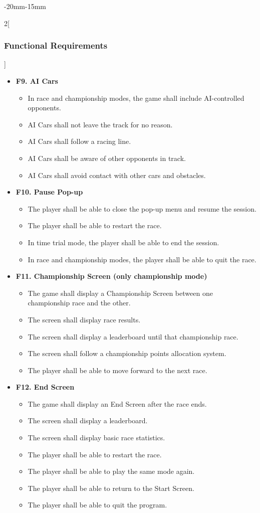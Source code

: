 \documentclass[12pt]{article}
\begin{document}
\begin{adjustwidth}{-20mm}{-15mm}
\begin{multicols}{2}[\subsubsection{Functional Requirements}]
\begin{itemize}[leftmargin=*]
\item \textbf{F9. AI Cars}
\begin{itemize}[leftmargin=*]
\item In race and championship modes, the game shall include AI-controlled opponents.
\item AI Cars shall not leave the track for no reason.
\item AI Cars shall follow a racing line.
\item AI Cars shall be aware of other opponents in track.
\item AI Cars shall avoid contact with other cars and obstacles.
\end{itemize}

\item \textbf{F10. Pause Pop-up}
\begin{itemize}[leftmargin=*]
\item The player shall be able to close the pop-up menu and resume the session.
\item The player shall be able to restart the race.
\item In time trial mode, the player shall be able to end the session.
\item In race and championship modes, the player shall be able to quit the race.
\end{itemize}

\item \textbf{F11. Championship Screen (only championship mode)}
\begin{itemize}[leftmargin=*]
\item The game shall display a Championship Screen between one championship race and the other.
\item The screen shall display race results.
\item The screen shall display a leaderboard until that championship race.
\item The screen shall follow a championship points allocation system.
\item The player shall be able to move forward to the next race.
\end{itemize}

\item \textbf{F12. End Screen}
\begin{itemize}[leftmargin=*]
\item The game shall display an End Screen after the race ends.
\item The screen shall display a leaderboard.
\item The screen shall display basic race statistics.
\item The player shall be able to restart the race.
\item The player shall be able to play the same mode again.
\item The player shall be able to return to the Start Screen.
\item The player shall be able to quit the program.
\end{itemize}
\end{itemize}


\end{multicols}
\end{adjustwidth}
\end{document}
